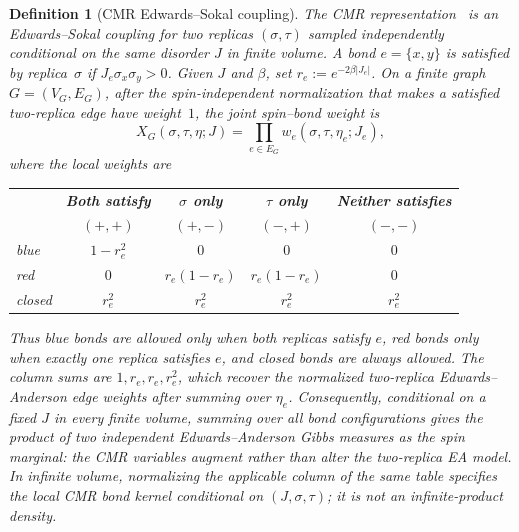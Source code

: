 \documentclass[11pt]{article}
\newtheorem{definition}[theorem]{Definition}
\numberwithin{theorem}{section}
\theoremstyle{remark}
\begin{document}
\begin{definition}[CMR Edwards--Sokal coupling]\label{def:CMR}
The CMR representation~\cite{CMR1998} is an Edwards--Sokal coupling for two replicas $(\sigma, \tau)$ sampled independently conditional on the same disorder $J$ in finite volume.
A bond $e = \{x,y\}$ is \emph{satisfied} by replica~$\sigma$ if $J_e \sigma_x \sigma_y > 0$.
Given $J$ and $\beta$, set $r_e := e^{-2\beta|J_e|}$.
On a finite graph $G=(V_G,E_G)$, after the spin-independent normalization that makes a satisfied two-replica edge have weight~$1$, the joint spin--bond weight is
\begin{equation}\label{eq:ES}
  X_G(\sigma, \tau, \eta; J) = \prod_{e \in E_G} w_e(\sigma, \tau, \eta_e; J_e),
\end{equation}
where the local weights are

\begin{center}
\renewcommand{\arraystretch}{1.1}
\begin{tabular}{lcccc}
& \textbf{Both satisfy} & \textbf{$\sigma$ only} & \textbf{$\tau$ only} & \textbf{Neither satisfies} \\
& $(+,+)$ & $(+,-)$ & $(-,+)$ & $(-,-)$ \\
\hline
\textup{blue} & $1-r_e^2$ & $0$ & $0$ & $0$ \\
\textup{red} & $0$ & $r_e(1-r_e)$ & $r_e(1-r_e)$ & $0$ \\
\textup{closed} & $r_e^2$ & $r_e^2$ & $r_e^2$ & $r_e^2$ \\
\end{tabular}
\end{center}

Thus blue bonds are allowed only when both replicas satisfy $e$, red bonds only when exactly one replica satisfies $e$, and closed bonds are always allowed.
The column sums are $1,r_e,r_e,r_e^2$, which recover the normalized two-replica Edwards--Anderson edge weights after summing over $\eta_e$.
Consequently, conditional on a fixed $J$ in every finite volume, summing over all bond configurations gives the product of two independent Edwards--Anderson Gibbs measures as the spin marginal: the CMR variables augment rather than alter the two-replica EA model.
In infinite volume, normalizing the applicable column of the same table specifies the local CMR bond kernel conditional on $(J,\sigma,\tau)$; it is not an infinite-product density.

\end{definition}
\end{document}
